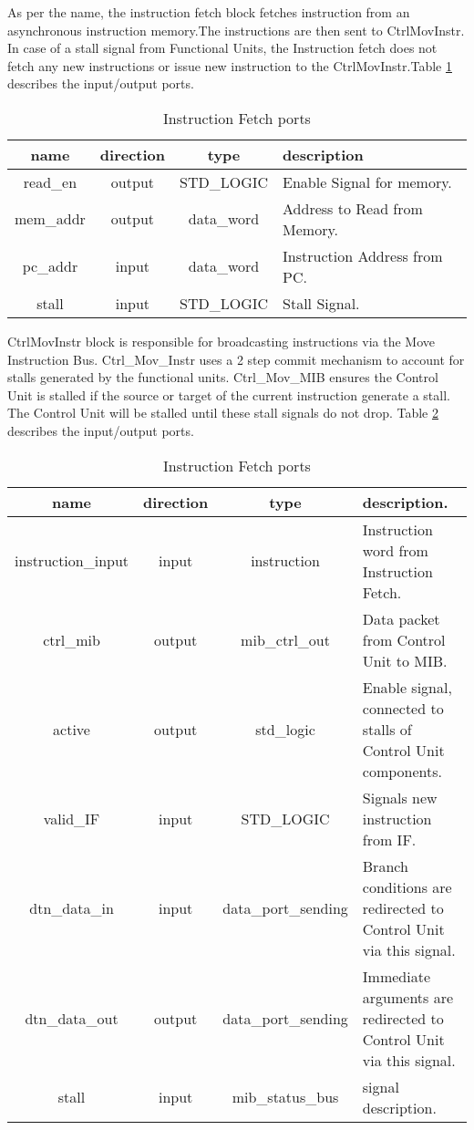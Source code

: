 		As per the name, the instruction fetch block fetches instruction from an asynchronous instruction memory.The instructions are then sent to Ctrl\textunderscore Mov\textunderscore Instr. In case of a stall signal from Functional Units, the Instruction fetch does not fetch any new instructions or issue new instruction to the Ctrl\textunderscore Mov\textunderscore Instr.Table \ref{table:instrfetch} describes the input/output ports.
\begin{table}[!h]
	\begin{tabular}{| c| c| c| p{9cm} |}
	\hline
	\textbf{name} & \textbf{direction} & \textbf{type} &  \textbf{description}\\ \hline			
	read\_en & output &  STD\_LOGIC & Enable Signal for memory.\\  \hline
	mem\_addr & output &  data\_word & Address to Read from Memory.\\  \hline
	pc\_addr & input &  data\_word & Instruction Address from PC.\\  \hline		
	stall &  input &  STD\_LOGIC & Stall Signal.\\  \hline
	\end{tabular}
	\caption{Instruction Fetch ports \label{table:instrfetch}}
	\centering
\end{table}


		Ctrl\textunderscore Mov\textunderscore Instr block is responsible for broadcasting instructions via the Move Instruction Bus. Ctrl\_Mov\_Instr uses a 2 step commit mechanism to account for stalls generated by the functional units. 	Ctrl\_Mov\_MIB ensures the Control Unit is stalled if the source or target of the current instruction generate a stall. The Control Unit will be stalled until these stall signals do not drop. Table \ref{table:ctrlToMib} describes the input/output ports.
\begin{table}[!h]
	\begin{tabular}{| c| c| c| p{9cm} |}
	\hline
		\textbf{name} & \textbf{direction} & \textbf{type} &  \textbf{description.}\\ \hline		
		instruction\_input & input & instruction & Instruction word from Instruction Fetch.\\ \hline
		ctrl\_mib & output & mib\_ctrl\_out & Data packet from Control Unit to MIB.\\ \hline
		active  & output & std\_logic & Enable signal, connected to stalls of Control Unit components.\\ \hline
		valid\_IF & input & STD\_LOGIC & Signals new instruction from IF.\\ \hline
		dtn\_data\_in	 & input & data\_port\_sending & Branch conditions are redirected to Control Unit via this signal.\\ \hline
		dtn\_data\_out & output & data\_port\_sending & Immediate arguments are redirected to Control Unit via this signal.\\ \hline
		stall & input & mib\_status\_bus & signal description.\\ \hline
	\end{tabular}
	\caption{Instruction Fetch ports \label{table:ctrlToMib}}
	\centering		
\end{table}		


